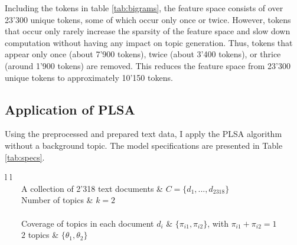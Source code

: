 \documentclass[11pt,a4paper,english,oneside]{book}
\newcommand{\tabitem}{~~\llap{\textbullet}~~}
\numberwithin{equation}{chapter}
\begin{document}
Including the tokens in table \ref{tab:bigrams}, the feature space consists of over 23'300 unique tokens, some of which occur only once or twice. However, tokens that occur only rarely increase the sparsity of the feature space and slow down computation without having any impact on topic generation. Thus, tokens that appear only once (about 7'900 tokens), twice (about 3'400 tokens), or thrice (around 1'900 tokens) are removed. This reduces the feature space from 23'300 unique tokens to approximately 10'150 tokens. 


\subsection{Application of PLSA}\label{appPLSA}

Using the preprocessed and prepared text data, I apply the PLSA algorithm without a background topic. The model specifications are presented in Table \ref{tab:specs}.

\begin{table}[h] %
	\centering %
	\begin{tabular}{ l  l  } %
		\toprule %
		 \\
		\midrule %
		\tabitem A collection of 2'318  text documents & $C=\{d_1,...,d_{2318}\}$ \\
		\tabitem Number of topics & $k = 2$ \\
		\midrule
		 \\
		\midrule
		\tabitem Coverage of topics in each document $d_i$ & $\{\pi_{i1}, \pi_{i2}\}$, with $\pi_{i1}+\pi_{i2}=1$\\
		\tabitem $2$ topics & $\{\theta_1, \theta_2\}$\\ %
		\bottomrule %
	\end{tabular}
	\caption{Specification of PLSA model.} %
	\label{tab:specs} %
\end{table}
\end{document}
